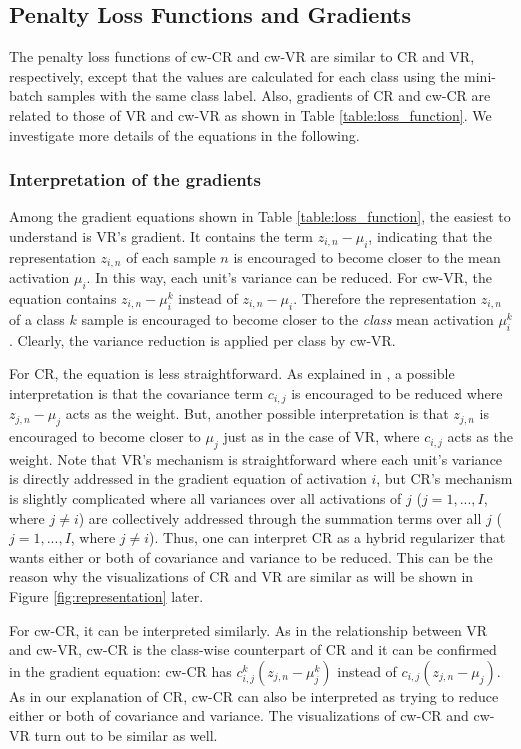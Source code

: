 \subsection{Penalty Loss Functions and Gradients}

The penalty loss functions of cw-CR and cw-VR are similar to CR and VR, respectively, except that the values are calculated for each class using the mini-batch samples with the same class label. Also, gradients of CR and cw-CR are related to those of VR and cw-VR as shown in Table \ref{table:loss_function}. We investigate more details of the equations in the following.

\subsubsection{Interpretation of the gradients}
Among the gradient equations shown in Table \ref{table:loss_function}, the easiest to understand is VR's gradient. It contains the term ${z}_{i,n}-{\mu}_{i}$, indicating that the representation ${z}_{i,n}$ of each sample $n$ is encouraged to become closer to the mean activation ${\mu}_{i}$. In this way, each unit's variance can be reduced. For cw-VR, the equation contains ${z}_{i,n}-{\mu}_{i}^{k}$ instead of ${z}_{i,n}-{\mu}_{i}$. Therefore the representation ${z}_{i,n}$ of a class $k$ sample is encouraged to become closer to the \textit{class} mean activation ${\mu}_{i}^{k}$. Clearly, the variance reduction is applied per class by cw-VR. 

For CR, the equation is less straightforward. As explained in \cite{cogswell2015reducing}, a possible interpretation is that the covariance term $c_{i,j}$ is encouraged to be reduced where $z_{j,n}-\mu_j$ acts as the weight. But, another possible interpretation is that $z_{j,n}$ is encouraged to become closer to $\mu_j$ just as in the case of VR, where $c_{i,j}$ acts as the weight. Note that VR's mechanism is straightforward where each unit's variance is directly addressed in the gradient equation of activation $i$, but CR's mechanism is slightly complicated where all variances over all activations of $j$ ($j=1,...,I$, where $j \neq i$) are collectively addressed through the summation terms over all $j$ ($j=1,...,I$, where $j \neq i$). Thus, one can interpret CR as a hybrid regularizer that wants either or both of covariance and variance to be reduced. This can be the reason why the visualizations of CR and VR are similar as will be shown in Figure \ref{fig:representation} later. 

For cw-CR, it can be interpreted similarly. As in the relationship between VR and cw-VR, cw-CR is the class-wise counterpart of CR and it can be confirmed in the gradient equation: cw-CR has $c_{i,j}^k({z}_{j,n}-{\mu}_{j}^{k})$ instead of $c_{i,j}({z}_{j,n}-{\mu}_{j})$. As in our explanation of CR, cw-CR can also be interpreted as trying to reduce either or both of covariance and variance. The visualizations of cw-CR and cw-VR turn out to be similar as well. 

